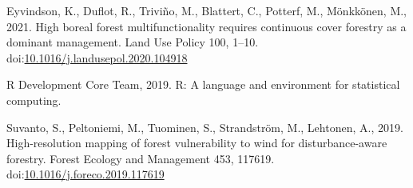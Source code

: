 \documentclass[]{elsarticle} %
\begin{document}
\hypertarget{refs}{}
\hypertarget{ref-Eyvindson2020}{}
Eyvindson, K., Duflot, R., Triviño, M., Blattert, C., Potterf, M.,
Mönkkönen, M., 2021. High boreal forest multifunctionality requires
continuous cover forestry as a dominant management. Land Use Policy 100,
1--10.
doi:\href{https://doi.org/10.1016/j.landusepol.2020.104918}{10.1016/j.landusepol.2020.104918}

\hypertarget{ref-RDevelopmentCoreTeam2019}{}
R Development Core Team, 2019. R: A language and environment for
statistical computing.

\hypertarget{ref-Suvanto2019}{}
Suvanto, S., Peltoniemi, M., Tuominen, S., Strandström, M., Lehtonen,
A., 2019. High-resolution mapping of forest vulnerability to wind for
disturbance-aware forestry. Forest Ecology and Management 453, 117619.
doi:\href{https://doi.org/10.1016/j.foreco.2019.117619}{10.1016/j.foreco.2019.117619}
\end{document}
